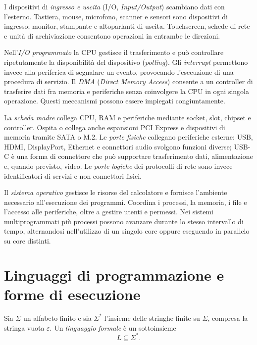 I dispositivi di \emph{ingresso e uscita} (I/O, \emph{Input/Output})
scambiano dati con l'esterno. Tastiera, mouse, microfono, scanner e
sensori sono dispositivi di ingresso; monitor, stampante e altoparlanti
di uscita. Touchscreen, schede di rete e unità di archiviazione
consentono operazioni in entrambe le direzioni.

Nell'\emph{I/O programmato} la CPU gestisce il trasferimento e può
controllare ripetutamente la disponibilità del dispositivo
(\emph{polling}). Gli \emph{interrupt} permettono invece alla
periferica di segnalare un evento, provocando l'esecuzione di una
procedura di servizio. Il \emph{DMA} (\emph{Direct Memory Access})
consente a un controller di trasferire dati fra memoria e periferiche
senza coinvolgere la CPU in ogni singola operazione. Questi
meccanismi possono essere impiegati congiuntamente.

La \emph{scheda madre} collega CPU, RAM e periferiche mediante
socket, slot, chipset e controller. Ospita o collega anche espansioni
PCI Express e dispositivi di memoria tramite SATA o M.2.
Le \emph{porte fisiche} collegano periferiche esterne: USB,
HDMI, DisplayPort, Ethernet e connettori audio svolgono funzioni
diverse; USB-C è una forma di connettore che può supportare
trasferimento dati, alimentazione e, quando previsto, video.
Le \emph{porte logiche} dei protocolli di rete sono invece
identificatori di servizi e non connettori fisici.

Il \emph{sistema operativo} gestisce le risorse del calcolatore
e fornisce l'ambiente necessario all'esecuzione dei programmi.
Coordina i processi, la memoria, i file e l'accesso alle periferiche,
oltre a gestire utenti e permessi. Nei sistemi multiprogrammati
più processi possono avanzare durante lo stesso intervallo di tempo,
alternandosi nell'utilizzo di un singolo core oppure eseguendo
in parallelo su core distinti.

\section{Linguaggi di programmazione e forme di esecuzione}
\label{sec:fi-linguaggi-esecuzione}

\begin{definition}
\label{def:fi-linguaggio-formale}
Sia \(\Sigma\) un alfabeto finito e sia \(\Sigma^*\) l'insieme
delle stringhe finite su \(\Sigma\), compresa la stringa vuota
\(\varepsilon\). Un \emph{linguaggio formale} è un sottoinsieme
\[
  L\subseteq\Sigma^*.
\]
\end{definition}

